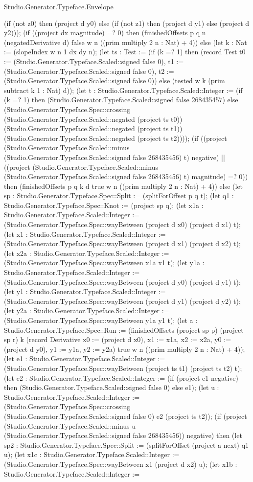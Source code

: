 \begin{lexlean}{Studio.Generator.Typeface.Envelope}
\begin{semanticmodule}
{(if (not z0) then (project d y0) else (if (not z1) then (project d y1) else (project d y2))); (if ((project dx magnitude) =? 0) then (finishedOffsets p q n (negatedDerivative d) false w n ((prim multiply 2 n : Nat) + 4)) else (let k : Nat := (slopeIndex w n 1 dx dy n); (let ts : Test := (if (k =? 1) then (record Test {t0 := (Studio.Generator.Typeface.Scaled::signed false 0), t1 := (Studio.Generator.Typeface.Scaled::signed false 0), t2 := (Studio.Generator.Typeface.Scaled::signed false 0)}) else (tested w k (prim subtract k 1 : Nat) d)); (let t : Studio.Generator.Typeface.Scaled::Integer := (if (k =? 1) then (Studio.Generator.Typeface.Scaled::signed false 268435457) else (Studio.Generator.Typeface.Spec::crossing (Studio.Generator.Typeface.Scaled::negated (project ts t0)) (Studio.Generator.Typeface.Scaled::negated (project ts t1)) (Studio.Generator.Typeface.Scaled::negated (project ts t2)))); (if ((project (Studio.Generator.Typeface.Scaled::minus (Studio.Generator.Typeface.Scaled::signed false 268435456) t) negative) || ((project (Studio.Generator.Typeface.Scaled::minus (Studio.Generator.Typeface.Scaled::signed false 268435456) t) magnitude) =? 0)) then (finishedOffsets p q k d true w n ((prim multiply 2 n : Nat) + 4)) else (let sp : Studio.Generator.Typeface.Spec::Split := (splitForOffset p q t); (let q1 : Studio.Generator.Typeface.Spec::Knot := (project sp q); (let x1a : Studio.Generator.Typeface.Scaled::Integer := (Studio.Generator.Typeface.Spec::wayBetween (project d x0) (project d x1) t); (let x1 : Studio.Generator.Typeface.Scaled::Integer := (Studio.Generator.Typeface.Spec::wayBetween (project d x1) (project d x2) t); (let x2a : Studio.Generator.Typeface.Scaled::Integer := (Studio.Generator.Typeface.Spec::wayBetween x1a x1 t); (let y1a : Studio.Generator.Typeface.Scaled::Integer := (Studio.Generator.Typeface.Spec::wayBetween (project d y0) (project d y1) t); (let y1 : Studio.Generator.Typeface.Scaled::Integer := (Studio.Generator.Typeface.Spec::wayBetween (project d y1) (project d y2) t); (let y2a : Studio.Generator.Typeface.Scaled::Integer := (Studio.Generator.Typeface.Spec::wayBetween y1a y1 t); (let a : Studio.Generator.Typeface.Spec::Run := (finishedOffsets (project sp p) (project sp r) k (record Derivative {x0 := (project d x0), x1 := x1a, x2 := x2a, y0 := (project d y0), y1 := y1a, y2 := y2a}) true w n ((prim multiply 2 n : Nat) + 4)); (let e1 : Studio.Generator.Typeface.Scaled::Integer := (Studio.Generator.Typeface.Spec::wayBetween (project ts t1) (project ts t2) t); (let e2 : Studio.Generator.Typeface.Scaled::Integer := (if (project e1 negative) then (Studio.Generator.Typeface.Scaled::signed false 0) else e1); (let u : Studio.Generator.Typeface.Scaled::Integer := (Studio.Generator.Typeface.Spec::crossing (Studio.Generator.Typeface.Scaled::signed false 0) e2 (project ts t2)); (if (project (Studio.Generator.Typeface.Scaled::minus u (Studio.Generator.Typeface.Scaled::signed false 268435456)) negative) then (let sp2 : Studio.Generator.Typeface.Spec::Split := (splitForOffset (project a next) q1 u); (let x1c : Studio.Generator.Typeface.Scaled::Integer := (Studio.Generator.Typeface.Spec::wayBetween x1 (project d x2) u); (let x1b : Studio.Generator.Typeface.Scaled::Integer := }
\end{semanticmodule}
\end{lexlean}
